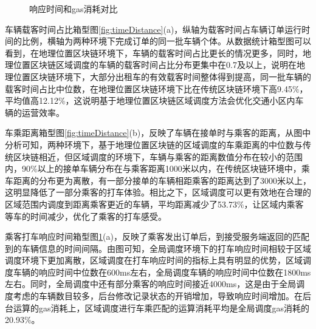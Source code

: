 \begin{figure}[h]
  \centering
  \caption{响应时间和gas消耗对比}
  \label{fig:manageGas}
\end{figure}

车辆载客时间占比箱型图\ref{fig:timeDistance}(a)，纵轴为载客时间占车辆订单运行时间的比例，横轴为两种环境下完成订单的同一批车辆个体。从数据统计箱型图可以看到，在地理位置区块链环境下，车辆的载客时间占比更长的情况更多，同时，地理位置区块链区域调度的车辆的载客时间占比分布更集中在0.7及以上，说明在地理位置区块链环境下，大部分出租车的有效载客时间整体得到提高，同一批车辆的载客时间占比中位数，在地理位置区块链环境下比在传统区块链环境下高9.45$\%$，平均值高12.12$\%$，这说明基于地理位置区块链区域调度方法会优化交通小区内车辆的运营效率。

车乘距离箱型图\ref{fig:timeDistance}(b)，反映了车辆在接单时与乘客的距离，从图中分析可知，两种环境下，基于地理位置区块链的区域调度的车乘距离的中位数与传统区块链相近，但区域调度的环境下，车辆与乘客的距离数值分布在较小的范围内，90$\%$以上的接单车辆分布在与乘客距离1000米以内，在传统区块链环境中，乘车距离的分布更为离散，有一部分接单的车辆相距乘客的距离达到了3000米以上，这明显降低了一部分乘客的打车体验。相比之下，区域调度可以更有效地在合理的区域范围内调度到距离乘客更近的车辆，平均距离减少了53.73$\%$，让区域内乘客等车的时间减少，优化了乘客的打车感受。

乘客打车响应时间箱型图\ref{fig:manageGas}(a)，反映了乘客发出订单后，到接受服务端返回的匹配到的车辆信息的时间间隔。由图可知，全局调度环境下的打车响应时间相较于区域调度环境下更加离散，区域调度在打车响应时间的指标上具有明显的优势，区域调度车辆的响应时间中位数在600ms左右，全局调度车辆的响应时间中位数在1800ms左右。同时，全局调度中还有部分乘客的响应时间接近4000ms，这是由于全局调度考虑的车辆数目较多，后台修改记录状态的开销增加，导致响应时间增加。在后台运算的gas消耗上，区域调度进行车乘匹配的运算消耗平均是全局调度gas消耗的20.93$\%$。

